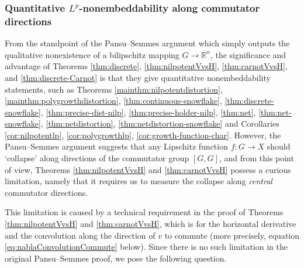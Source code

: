 \documentclass[11pt,reqno]{amsart}
\newcommand{\1}{\mathbf 1}
\begin{document}
\subsubsection{Quantitative $L^p$-nonembeddability along commutator directions}



From the standpoint of the Pansu--Semmes argument which simply outputs the qualitative nonexistence of a bilipschitz mapping $G\to \mathbb{R}^n$, the significance and advantage of Theorems \ref{thm:discrete}, \ref{thm:nilpotentVvsH}, \ref{thm:carnotVvsH}, and \ref{thm:discrete-Carnot} is that they give quantitative nonembeddability statements, such as  Theorems \ref{mainthm:nilpotentdistortion}, \ref{mainthm:polygrowthdistortion}, \ref{thm:continuous-snowflake}, \ref{thm:discrete-snowflake}, \ref{thm:precise-dist-nilp}, \ref{thm:precise-holder-nilp}, \ref{thm:net}, \ref{thm:net-snowflake}, \ref{thm:netdistortion}, \ref{thm:netdistortion-snowflake} and Corollaries \ref{cor:nilpotentlp}, \ref{cor:polygrowthlp}, \ref{cor:growth-function-char}. However, the Pansu--Semmes argument suggests that any Lipschitz function $f:G\to X$ should `collapse' along directions of the commutator group $\left[G,G\right]$, and from this point of view, Theorems \ref{thm:nilpotentVvsH} and \ref{thm:carnotVvsH} possess a curious limitation, namely that it requires us to measure the collapse along \emph{central} commutator directions.

This limitation is caused by a technical requirement in the proof of Theorems \ref{thm:nilpotentVvsH} and \ref{thm:carnotVvsH}, which is for the horizontal derivative and the convolution along the direction of $v$ to commute (more precisely, equation \eqref{eq:nablaConvolutionCommute} below). Since there is no such limitation in the original Pansu--Semmes proof, we pose the following question.
\end{document}
